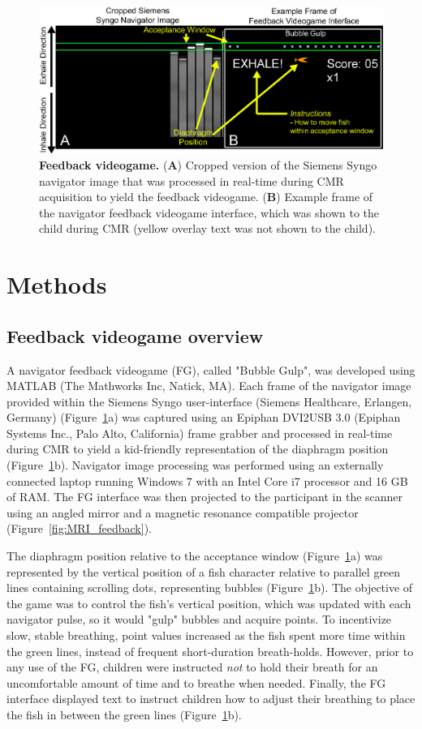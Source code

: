 \begin{figure} 
	\includegraphics{figures/gamepaper/01-FeedbackGame}
	\caption[Feedback videogame]{\textbf{Feedback videogame.} (\textbf{A}) Cropped version of the Siemens Syngo navigator image that was processed in real-time during CMR acquisition to yield the feedback videogame. (\textbf{B}) Example frame of the navigator feedback videogame interface, which was shown to the child during CMR (yellow overlay text was not shown to the child).}
	\label{fig:feedbackgame}
\end{figure}

\section{Methods}
\subsection{Feedback videogame overview}
	A navigator feedback videogame (FG), called "Bubble Gulp", was developed using MATLAB (The Mathworks Inc, Natick, MA). Each frame of the navigator image provided within the Siemens Syngo user-interface (Siemens Healthcare, Erlangen, Germany) (Figure~\ref{fig:feedbackgame}a) was captured using an Epiphan DVI2USB 3.0 (Epiphan Systems Inc., Palo Alto, California) frame grabber and processed in real-time during CMR to yield a kid-friendly representation of the diaphragm position (Figure~\ref{fig:feedbackgame}b). Navigator image processing was performed using an externally connected laptop running Windows 7 with an Intel Core i7 processor and 16 GB of RAM. The FG interface was then projected to the participant in the scanner using an angled mirror and a magnetic resonance compatible projector (Figure~\ref{fig:MRI_feedback}).
	
	The diaphragm position relative to the acceptance window (Figure~\ref{fig:feedbackgame}a) was represented by the vertical position of a fish character relative to parallel green lines containing scrolling dots, representing bubbles (Figure~\ref{fig:feedbackgame}b). The objective of the game was to control the fish's vertical position, which was updated with each navigator pulse, so it would "gulp" bubbles and acquire points. To incentivize slow, stable breathing, point values increased as the fish spent more time within the green lines, instead of frequent short-duration breath-holds. However, prior to any use of the FG, children were instructed \textit{not} to hold their breath for an uncomfortable amount of time and to breathe when needed. Finally, the FG interface displayed text to instruct children how to adjust their breathing to place the fish in between the green lines (Figure~\ref{fig:feedbackgame}b).


